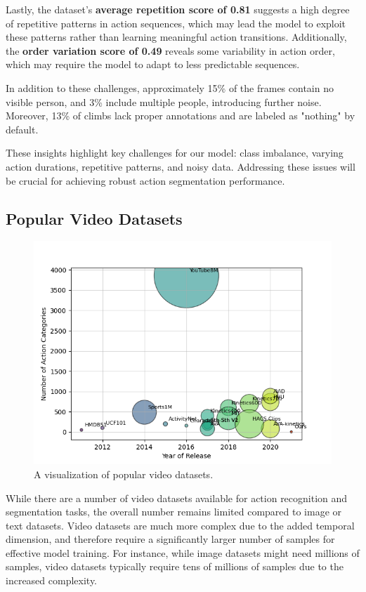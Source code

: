 Lastly, the dataset's \textbf{average repetition score of 0.81} suggests a high degree of repetitive patterns in action sequences, which may lead the model to exploit these patterns rather than learning meaningful action transitions. Additionally, the \textbf{order variation score of 0.49} reveals some variability in action order, which may require the model to adapt to less predictable sequences.

In addition to these challenges, approximately 15\% of the frames contain no visible person, and 3\% include multiple people, introducing further noise. Moreover, 13\% of climbs lack proper annotations and are labeled as "nothing" by default.

These insights highlight key challenges for our model: class imbalance, varying action durations, repetitive patterns, and noisy data. Addressing these issues will be crucial for achieving robust action segmentation performance.

\subsection{Popular Video Datasets}

\label{subsection:popular-video-datasets}

\begin{figure}[h!]
    \centering
    \includegraphics[width=1\linewidth]{../../assets/figures/popular-datasets.png}
    \caption{A visualization of popular video datasets.}
    \label{fig:your-label}
\end{figure}

While there are a number of video datasets available for action recognition and segmentation tasks, the overall number remains limited compared to image or text datasets. Video datasets are much more complex due to the added temporal dimension, and therefore require a significantly larger number of samples for effective model training. For instance, while image datasets might need millions of samples, video datasets typically require tens of millions of samples due to the increased complexity.

